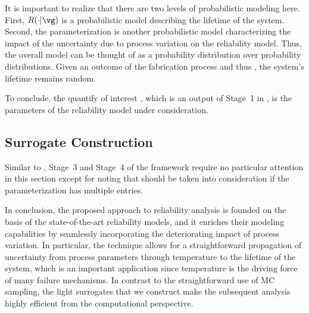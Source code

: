 \begin{remark} 
It is important to realize that there are two levels of probabilistic modeling
here. First, $R(\cdot | \vg)$ \perse is a probabilistic model describing the
lifetime \life of the system. Second, the parameterization \vg is another
probabilistic model characterizing the impact of the uncertainty due to process
variation on the reliability model. Thus, the overall model can be thought of as
a probability distribution over probability distributions. Given an outcome of
the fabrication process and thus \vg, the system's lifetime remains random.
\end{remark}

To conclude, the quantify of interest \g, which is an output of Stage~1 in
, is the parameters \vg of the reliability model under
consideration.

\subsection{Surrogate Construction}

Similar to , Stage~3 and Stage~4 of the
framework require no particular attention in this section except for noting that
 should be taken into consideration if the
parameterization \vg has multiple entries.

\conclusioncut
In conclusion, the proposed approach to reliability analysis is founded on the
basis of the state-of-the-art reliability models, and it enriches their modeling
capabilities by seamlessly incorporating the deteriorating impact of process
variation. In particular, the technique allows for a straightforward propagation
of uncertainty from process parameters through temperature to the lifetime of
the system, which is an important application since temperature is the driving
force of many failure mechanisms. In contrast to the straightforward use of
\ac{MC} sampling, the light surrogates that we construct make the subsequent
analysis highly efficient from the computational perspective.
